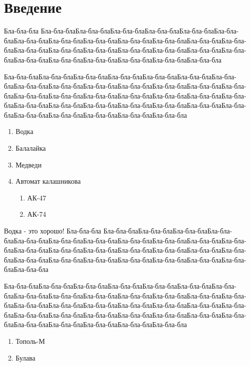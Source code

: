 \chapter*{Введение}

Бла-бла-бла Бла-бла-блаБла-бла-блаБла-бла-блаБла-бла-блаБла-бла-блаБла-бла-блаБла-бла-блаБла-бла-блаБла-бла-блаБла-бла-блаБла-бла-блаБла-бла-блаБла-бла-блаБла-бла-блаБла-бла-блаБла-бла-блаБла-бла-блаБла-бла-блаБла-бла-блаБла-бла-блаБла-бла-блаБла-бла-блаБла-бла-блаБла-бла-блаБла-бла-блаБла-бла-бла

Бла-бла-блаБла-бла-блаБла-бла-блаБла-бла-блаБла-бла-блаБла-бла-блаБла-бла-блаБла-бла-блаБла-бла-блаБла-бла-блаБла-бла-блаБла-бла-блаБла-бла-блаБла-бла-блаБла-бла-блаБла-бла-блаБла-бла-блаБла-бла-блаБла-бла-блаБла-бла-блаБла-бла-блаБла-бла-блаБла-бла-блаБла-бла-блаБла-бла-блаБла-бла-блаБла-бла-блаБла-бла-блаБла-бла-блаБла-бла-блаБла-бла-блаБла-бла-блаБла-бла-бла

\begin{enumerate}
	\item Водка
	\item Балалайка
	\item Медведи
	\item Автомат калашникова
	\begin{enumerate}
		\item АК-47
		\item АК-74
	\end{enumerate}
\end{enumerate}

Водка - это хорошо!
Бла-бла-бла Бла-бла-блаБла-бла-блаБла-бла-блаБла-бла-блаБла-бла-блаБла-бла-блаБла-бла-блаБла-бла-блаБла-бла-блаБла-бла-блаБла-бла-блаБла-бла-блаБла-бла-блаБла-бла-блаБла-бла-блаБла-бла-блаБла-бла-блаБла-бла-блаБла-бла-блаБла-бла-блаБла-бла-блаБла-бла-блаБла-бла-блаБла-бла-блаБла-бла-блаБла-бла-бла

Бла-бла-блаБла-бла-блаБла-бла-блаБла-бла-блаБла-бла-блаБла-бла-блаБла-бла-блаБла-бла-блаБла-бла-блаБла-бла-блаБла-бла-блаБла-бла-блаБла-бла-блаБла-бла-блаБла-бла-блаБла-бла-блаБла-бла-блаБла-бла-блаБла-бла-блаБла-бла-блаБла-бла-блаБла-бла-блаБла-бла-блаБла-бла-блаБла-бла-блаБла-бла-блаБла-бла-блаБла-бла-блаБла-бла-блаБла-бла-блаБла-бла-блаБла-бла-блаБла-бла-бла

\begin{enumerate}
	\item Тополь-М
	\item Булава
\end{enumerate}